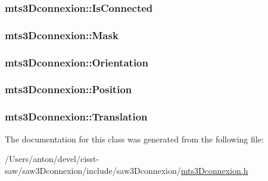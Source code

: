 \subsubsection[{Is\+Connected}]{ mts3\+Dconnexion\+::\+Is\+Connected\hspace{0.3cm}{\ttfamily [protected]}}\label{classmts3_dconnexion_a7242b5dd56fed7c290e054fe129e2c00}
\hypertarget{classmts3_dconnexion_a9aa79512dbed22a9c69d56ec7e757791}{}
\subsubsection[{Mask}]{ mts3\+Dconnexion\+::\+Mask\hspace{0.3cm}{\ttfamily [protected]}}\label{classmts3_dconnexion_a9aa79512dbed22a9c69d56ec7e757791}
\hypertarget{classmts3_dconnexion_afff4aa6e11a99251eaf021e9bba2047c}{}
\subsubsection[{Orientation}]{ mts3\+Dconnexion\+::\+Orientation\hspace{0.3cm}{\ttfamily [protected]}}\label{classmts3_dconnexion_afff4aa6e11a99251eaf021e9bba2047c}
\hypertarget{classmts3_dconnexion_a18477fb46941bead7c9c998aa4f64cae}{}
\subsubsection[{Position}]{ mts3\+Dconnexion\+::\+Position\hspace{0.3cm}{\ttfamily [protected]}}\label{classmts3_dconnexion_a18477fb46941bead7c9c998aa4f64cae}
\hypertarget{classmts3_dconnexion_a8e84db133cf3e6f2624b231a05e049bf}{}
\subsubsection[{Translation}]{ mts3\+Dconnexion\+::\+Translation\hspace{0.3cm}{\ttfamily [protected]}}\label{classmts3_dconnexion_a8e84db133cf3e6f2624b231a05e049bf}


The documentation for this class was generated from the following file\+:\begin{DoxyCompactItemize}
\item 
/\+Users/anton/devel/cisst-\/saw/saw3\+Dconnexion/include/saw3\+Dconnexion/\hyperlink{mts3_dconnexion_8h}{mts3\+Dconnexion.\+h}\end{DoxyCompactItemize}
